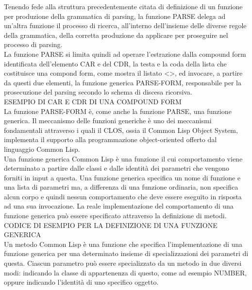 Tenendo fede alla struttura precedentemente citata di definizione di un
funzione per produzione della grammatica di parsing, la funzione PARSE delega
ad un’altra funzione il processo di ricerca, all’interno dell’insieme delle
diverse regole della grammatica, della corretta produzione da applicare per
proseguire nel processo di parsing.\\

La funzione PARSE si limita quindi ad operare l'estrazione dalla compound form
identificata dell’elemento CAR e del CDR, la testa e la coda della lista che
costituisce una compond form, come mostra il listato <>, ed invocare, a
partire da questi due elementi, la funzione generica PARSE-FORM, responsabile
per la prosecuzione del parsing secondo lo schema di discesa ricorsiva.\\

ESEMPIO DI CAR E CDR DI UNA COMPOUND FORM\\

La funzione PARSE-FORM è, come anche la funzione PARSE, una funzione generica.
Il meccanismo delle funzioni generiche è uno dei meccanismi fondamentali
attraverso i quali il CLOS, ossia il Common Lisp Object System, implementa il
supporto alla programmazione object-oriented offerto dal linguaggio Common
Lisp.\\

Una funzione generica Common Lisp è una funzione il cui comportamento viene
determinato a partire dalle classi e dalle identità dei parametri che vengono
forniti in input a questa. Una funzione generica specifica un nome di funzione
e una lista di parametri ma, a differenza di una funzione ordinaria, non
specifica alcun corpo e quindi nessun comportamento che deve essere eseguito
in risposta ad una sua invocazione. La reale implementazione del comportamento
di una funzione generica può essere specificato attraverso la definizione di
metodi.\\

CODICE DI ESEMPIO PER LA DEFINIZIONE DI UNA FUNZIONE GENERICA\\

Un metodo Common Lisp è una funzione che specifica l’implementazione di una
funzione generica per una determinato insieme di specializzazioni dei
parametri di questa. Ciascun parametro può essere specializzato da un metodo
in due diversi modi: indicando la classe di appartenenza di questo, come ad
esempio NUMBER, oppure indicando l’identità di uno specifico oggetto.\\

